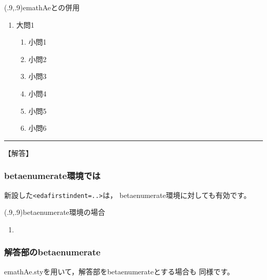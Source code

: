 \documentclass[fleqn,a4j]{jarticle}
\begin{document}
\begin{showEx}(.9,.9){\textsf{emathAe}との併用}
  \enumLmargin{0pt}
  \openKaiFile
  \begin{enumerate}[\protect\expandafter\fbox1]
    \item 大問1
      \begin{enumerate}[(1)]
        \item 小問1 
        \item 小問2 
        \item 小問3 
        \item 小問4 
        \item 小問5 
        \item 小問6 
      \end{enumerate}
  \end{enumerate}
  \closeKaiFile
  \hrule
  【解答】

\end{showEx}
\newpage

\subsubsection{\textsf{betaenumerate}環境では}
新設した\texttt{<edafirstindent=..>}は，
\textsf{betaenumerate}環境に対しても有効です。

\begin{showEx}(.9,.9){\textsf{betaenumerate}環境の場合}
\enumLmargini{0pt}
\begin{enumerate}[\protect\expandafter\fbox 1]
  \item
\end{enumerate}
\end{showEx}
\newpage

\subsubsection{解答部の\textsf{betaenumerate}}
\textsf{emathAe.sty}を用いて，解答部を\textsf{betaenumerate}とする場合も
同様です。
\end{document}
